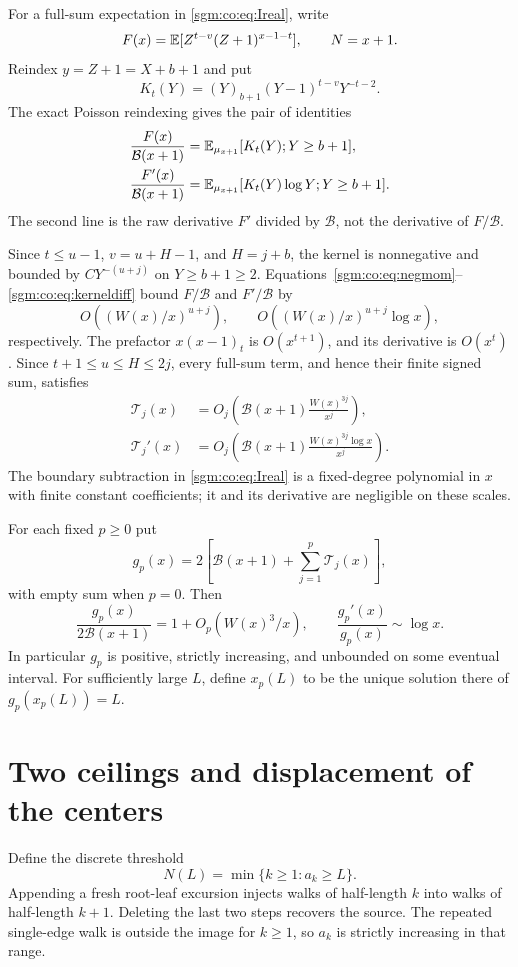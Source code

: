 \documentclass[11pt,letterpaper]{article}
\theoremstyle{remark}\newtheorem{remark}[theorem]{Remark}
\theoremstyle{definition}\newtheorem{definition}[theorem]{Definition}
\begin{document}
For a full-sum expectation in \eqref{sgm:co:eq:Ireal}, write
\[
 F(x)=\mathbb E[Z^{t-v}(Z+1)^{x-1-t}],\qquad N=x+1.
\]
Reindex $y=Z+1=X+b+1$ and put
\[
 K_t(Y)=(Y)_{b+1}(Y-1)^{t-v}Y^{-t-2}.
\]
The exact Poisson reindexing gives the pair of identities
\begin{align}
 \frac{F(x)}{\mathcal B(x+1)}
   &=\mathbb E_{\mu_{x+1}}[K_t(Y);Y\ge b+1],\label{sgm:co:eq:kernel}\\
 \frac{F'(x)}{\mathcal B(x+1)}
   &=\mathbb E_{\mu_{x+1}}[K_t(Y)\log Y;Y\ge b+1].\label{sgm:co:eq:kerneldiff}
\end{align}
The second line is the raw derivative $F'$ divided by $\mathcal B$, not the derivative of $F/\mathcal B$.

Since $t\le u-1$, $v=u+H-1$, and $H=j+b$, the kernel is nonnegative and bounded by $C Y^{-(u+j)}$ on $Y\ge b+1\ge2$. Equations~\eqref{sgm:co:eq:negmom}--\eqref{sgm:co:eq:kerneldiff} bound $F/\mathcal B$ and $F'/\mathcal B$ by
\[
 O((W(x)/x)^{u+j}),\qquad
 O((W(x)/x)^{u+j}\log x),
\]
respectively. The prefactor $x(x-1)_t$ is $O(x^{t+1})$, and its derivative is $O(x^t)$. Since $t+1\le u\le H\le2j$, every full-sum term, and hence their finite signed sum, satisfies
\begin{align}
 \mathcal T_j(x)&=O_j\!\left(\mathcal B(x+1)\frac{W(x)^{3j}}{x^j}\right),\label{sgm:co:eq:Tbound}\\
 \mathcal T_j'(x)&=O_j\!\left(\mathcal B(x+1)\frac{W(x)^{3j}\log x}{x^j}\right).\label{sgm:co:eq:Tdifference}
\end{align}
The boundary subtraction in \eqref{sgm:co:eq:Ireal} is a fixed-degree polynomial in $x$ with finite constant coefficients; it and its derivative are negligible on these scales.

For each fixed $p\ge0$ put
\begin{equation}\label{sgm:co:eq:gp}
 g_p(x)=2\left[\mathcal B(x+1)+\sum_{j=1}^p\mathcal T_j(x)\right],
\end{equation}
with empty sum when $p=0$. Then
\begin{equation}\label{sgm:co:eq:gpderivative}
 \frac{g_p(x)}{2\mathcal B(x+1)}=1+O_p(W(x)^3/x),\qquad
 \frac{g_p'(x)}{g_p(x)}\sim\log x.
\end{equation}
In particular $g_p$ is positive, strictly increasing, and unbounded on some eventual interval. For sufficiently large $L$, define $x_p(L)$ to be the unique solution there of $g_p(x_p(L))=L$.

\section{Two ceilings and displacement of the centers}\label{sgm:co:sec:inverse}
Define the discrete threshold
\[
 N(L)=\min\{k\ge1:a_k\ge L\}.
\]
Appending a fresh root-leaf excursion injects walks of half-length $k$ into walks of half-length $k+1$. Deleting the last two steps recovers the source. The repeated single-edge walk is outside the image for $k\ge1$, so $a_k$ is strictly increasing in that range.
\end{document}
